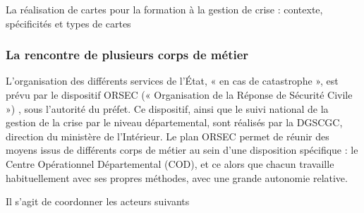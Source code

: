 \documentclass[10pt,a4paper]{report} %
\begin{document}
\begin{part}{La réalisation de cartes pour la formation à la gestion de crise : contexte, spécificités et types de cartes}
\subsubsection{La rencontre de plusieurs corps de métier}

L’organisation des différents services de l’État, « en cas de catastrophe », est prévu par le dispositif ORSEC (« Organisation de la Réponse de Sécurité Civile ») \parencite{ministeredelinterieurDispositifORSEC}, sous l’autorité du préfet. Ce dispositif, ainsi que le suivi national de la gestion de la crise par le niveau départemental, sont réalisés par la DGSCGC, direction du ministère de l’Intérieur. Le plan ORSEC permet de réunir des moyens issus de différents corps de métier au sein d’une disposition spécifique  : le Centre Opérationnel Départemental (COD), et ce alors que chacun travaille habituellement avec ses propres méthodes, avec une grande autonomie relative.

Il s’agit de coordonner les acteurs suivants


\end{part}
\end{document}
